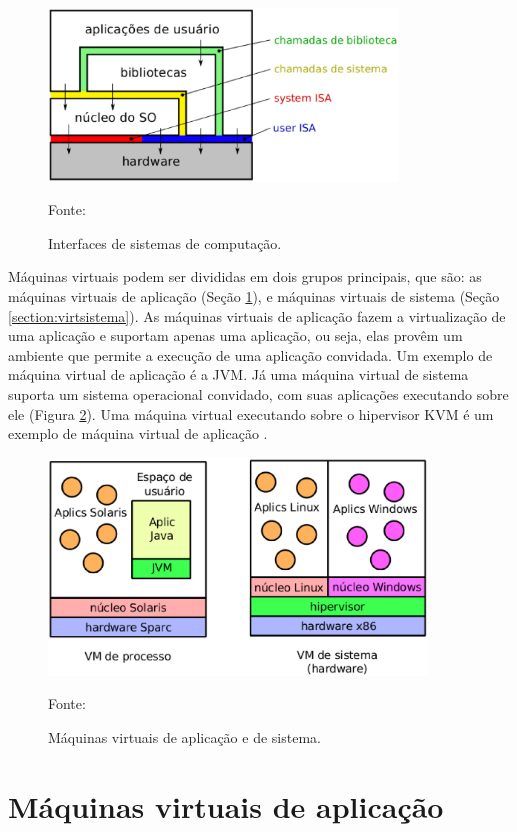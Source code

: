 \begin{figure}[h!]
 \centering
 \includegraphics[width=350px]{img/interfaces_isa.eps}
 \caption{Interfaces de sistemas de computação.}
 \label{fig:interfaces_isa}
 Fonte: \citet{maziero2013}
\end{figure}

Máquinas virtuais podem ser divididas em dois grupos principais, que são: as máquinas virtuais de aplicação (Seção \ref{section:virtaplicacao}), 
e máquinas virtuais de sistema (Seção \ref{section:virtsistema}). As máquinas virtuais de aplicação fazem a virtualização de uma 
aplicação e suportam apenas uma aplicação, ou seja, elas provêm um ambiente que permite a execução de
uma aplicação convidada. Um exemplo de máquina virtual de aplicação é a \ac{JVM}. Já uma máquina virtual de sistema suporta um sistema
operacional convidado, com suas aplicações executando sobre ele (Figura \ref{fig:vms_tipos}). Uma máquina virtual executando sobre o 
hipervisor \ac{KVM} é um exemplo de máquina virtual de aplicação \cite{laureano2008}.

\begin{figure}[h!]
 \centering
 \includegraphics[width=380px]{img/vms_tipos.eps}
 \caption{Máquinas virtuais de aplicação e de sistema.}
 \label{fig:vms_tipos}
 Fonte: \citet{laureano2008}
\end{figure}

\section{Máquinas virtuais de aplicação}
\label{section:virtaplicacao}

